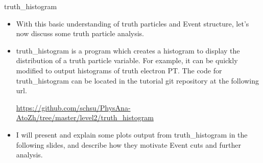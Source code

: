 \documentclass{beamer}
\begin{document}
	\begin{frame}{truth\_histogram}
		\begin{itemize}
\item<1->With this basic understanding of truth particles and Event structure, let's now discuss some truth particle analysis.

\bigskip

\item<1->truth\_histogram is a program which creates a histogram to display the distribution of a truth particle variable. For example, it can be quickly modified to output histograms of truth electron PT. The code for truth\_histogram can be located in the tutorial git repository at the following url.

\bigskip

\url{https://github.com/schsu/PhysAna-AtoZh/tree/master/level2/truth_histogram}

\bigskip

\item<1->I will present and explain some plots output from truth\_histogram in the following slides, and describe how they motivate Event cuts and further analysis.
		\end{itemize}
	\end{frame}
\end{document}
